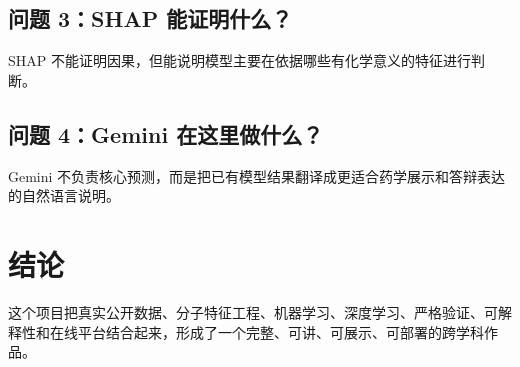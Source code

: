 \documentclass[11pt,a4paper]{ctexart}
\begin{document}
\subsection*{问题 3：SHAP 能证明什么？}
SHAP 不能证明因果，但能说明模型主要在依据哪些有化学意义的特征进行判断。

\subsection*{问题 4：Gemini 在这里做什么？}
Gemini 不负责核心预测，而是把已有模型结果翻译成更适合药学展示和答辩表达的自然语言说明。

\section{结论}
这个项目把真实公开数据、分子特征工程、机器学习、深度学习、严格验证、可解释性和在线平台结合起来，形成了一个完整、可讲、可展示、可部署的跨学科作品。
\end{document}
